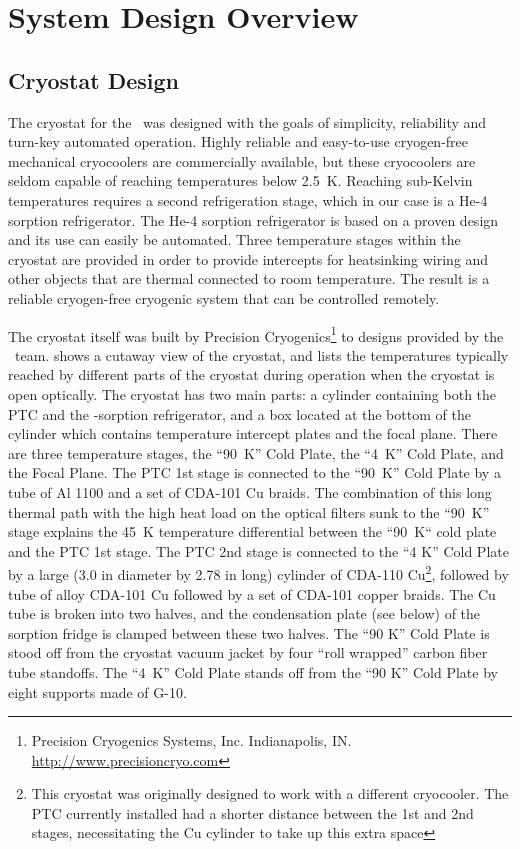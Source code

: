 \chapter{System Design Overview}\label{c:sys-design}

\section{Cryostat Design}\label{s-cryo-design}

The cryostat for the \Imager\ was designed with the goals of simplicity, reliability and turn-key automated operation.
Highly reliable and easy-to-use cryogen-free mechanical cryocoolers are commercially available, but these cryocoolers are seldom capable of reaching temperatures below 2.5~K.
Reaching sub-Kelvin temperatures requires a second refrigeration stage, which in our case is a He-4 sorption refrigerator.
The He-4 sorption refrigerator is based on a proven design and its use can easily be automated.
Three temperature stages within the cryostat are provided in order to provide intercepts for heatsinking wiring and other objects that are thermal connected to room temperature. 
The result is a reliable cryogen-free cryogenic system that can be controlled remotely.

The cryostat itself was built by Precision Cryogenics\footnote{Precision Cryogenics Systems, Inc. Indianapolis, IN. \url{http://www.precisioncryo.com}} to designs provided by the \Imager\ team.
 shows a cutaway view of the cryostat, and  lists the temperatures typically reached by different parts of the cryostat during operation when the cryostat is open optically.
The cryostat has two main parts: a cylinder containing both the PTC and the -sorption refrigerator, and a box located at the bottom of the cylinder which contains temperature intercept plates and the focal plane.
There are three temperature stages, the ``90~K'' Cold Plate, the ``4~K'' Cold Plate, and the Focal Plane.
The PTC 1st stage is connected to the ``90~K'' Cold Plate by a tube of Al 1100 and a set of CDA-101 Cu braids.
The combination of this long thermal path with the high heat load on the optical filters sunk to the ``90~K'' stage explains the 45~K temperature differential between the ``90~K`` cold plate and the PTC 1st stage.
The PTC 2nd stage is connected to the ``4 K'' Cold Plate by a large (3.0 in diameter by 2.78 in long) cylinder of CDA-110 Cu\footnote{This cryostat was originally designed to work with a different cryocooler. The PTC currently installed had a shorter distance between the 1st and 2nd stages, necessitating the Cu cylinder to take up this extra space}, followed by tube of alloy CDA-101 Cu followed by a set of  CDA-101 copper braids.
The Cu tube is broken into two halves, and the condensation plate (see below) of the sorption fridge is clamped between these two halves. The ``90 K'' Cold Plate is stood off from the cryostat vacuum jacket by four ``roll wrapped'' carbon fiber tube standoffs. The ``4~K'' Cold Plate stands off from the ``90 K'' Cold Plate by eight supports made of G-10.


